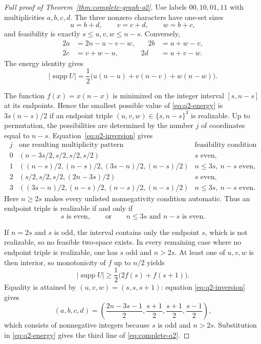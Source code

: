 \documentclass[11pt,letterpaper]{article}
\theoremstyle{plain}
\theoremstyle{definition}
\newcommand{\supp}{\operatorname{supp}}
\newcommand{\1}{\mathbf{1}}
\newcommand{\abs}[1]{\left|#1\right|}
\begin{document}
\begin{proof}[Full proof of Theorem~\ref{thm:complete-graph-q2}]
Use labels $00,10,01,11$ with multiplicities $a,b,c,d$.  The three nonzero characters
have one-set sizes
\[
 u=b+d,\qquad v=c+d,\qquad w=b+c,
\]
and feasibility is exactly $s\le u,v,w\le n-s$.  Conversely,
\begin{equation}\label{eq:q2-inversion}
 \begin{aligned}
 2a&=2n-u-v-w,&\quad 2b&=u+w-v,\\
 2c&=v+w-u,& 2d&=u+v-w.
 \end{aligned}
\end{equation}
The energy identity gives
\begin{equation}\label{eq:q2-energy}
 \abs{\supp U}
 =\frac12\bigl(u(n-u)+v(n-v)+w(n-w)\bigr).
\end{equation}

The function $f(x)=x(n-x)$ is minimized on the integer interval $[s,n-s]$ at its
endpoints.  Hence the smallest possible value of \eqref{eq:q2-energy} is
$3s(n-s)/2$ if an endpoint triple $(u,v,w)\in\{s,n-s\}^3$ is realizable.  Up to
permutation, the possibilities are determined by the number $j$ of coordinates equal
to $n-s$.  Equation~\eqref{eq:q2-inversion} gives
\[
\begin{array}{c|c|c}
 j & \text{one resulting multiplicity pattern} & \text{feasibility condition}\\
\hline
0&(n-3s/2,s/2,s/2,s/2)&s\text{ even},\\
1&((n-s)/2,(n-s)/2,(3s-n)/2,(n-s)/2)
  &n\le3s,\ n-s\text{ even},\\
2&(s/2,s/2,s/2,(2n-3s)/2)&s\text{ even},\\
3&((3s-n)/2,(n-s)/2,(n-s)/2,(n-s)/2)
  &n\le3s,\ n-s\text{ even}.
\end{array}
\]
Here $n\ge2s$ makes every unlisted nonnegativity condition automatic.  Thus an endpoint
triple is realizable if and only if
\[
 s\text{ is even},
 \qquad\text{or}\qquad
 n\le3s\text{ and }n-s\text{ is even}.
\]

If $n=2s$ and $s$ is odd, the interval contains only the endpoint $s$, which is not
realizable, so no feasible two-space exists.  In every remaining case where no endpoint
triple is realizable, one has $s$ odd and $n>2s$.  At least one of $u,v,w$ is then
interior, so monotonicity of $f$ up to $n/2$ yields
\[
 \abs{\supp U}\ge\frac12\bigl(2f(s)+f(s+1)\bigr).
\]
Equality is attained by $(u,v,w)=(s,s,s+1)$: equation
\eqref{eq:q2-inversion} gives
\[
 (a,b,c,d)=
 \left(\frac{2n-3s-1}{2},\frac{s+1}{2},
       \frac{s+1}{2},\frac{s-1}{2}\right),
\]
which consists of nonnegative integers because $s$ is odd and $n>2s$.  Substitution in
\eqref{eq:q2-energy} gives the third line of \eqref{eq:complete-q2}.
\end{proof}
\end{document}
